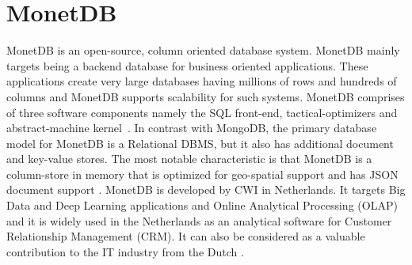 \section{MonetDB}

MonetDB is an open-source, column oriented database system. MonetDB mainly 
targets being a backend database for business oriented applications. These 
applications create very large databases having millions of rows and hundreds 
of columns and MonetDB supports scalability for such systems. MonetDB comprises 
of three software components namely the SQL front-end, tactical-optimizers and 
abstract-machine kernel~\cite{hid-sp18-416-www-monetdb-features}. In contrast 
with MongoDB, the primary database model for MonetDB is a Relational DBMS, but 
it also has additional document and key-value stores. The most notable 
characteristic is that MonetDB is a column-store in memory that is optimized 
for geo-spatial support and has JSON document support 
\cite{hid-sp18-416-www-monetdb-mongodb-comparison}. MonetDB is developed by CWI 
in Netherlands. It targets Big Data and Deep Learning applications and Online 
Analytical Processing (OLAP) and it is widely used in the Netherlands as an 
analytical software for Customer Relationship Management (CRM). It can also be 
considered as a valuable contribution to the IT industry from the Dutch 
\cite{hid-sp18-416-www-monetdb-dutch}.